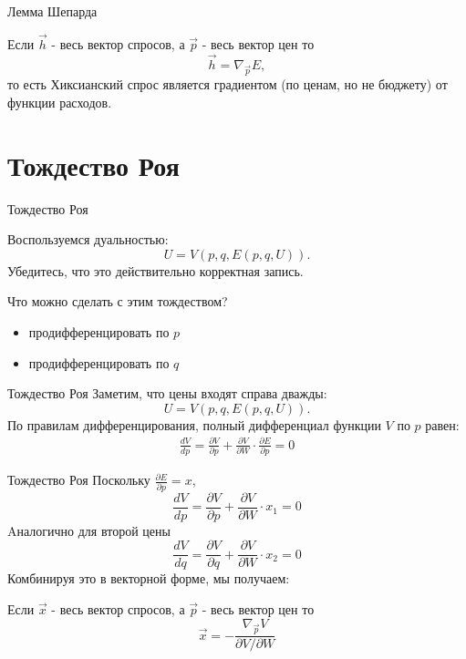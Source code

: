 \documentclass{beamer}
\begin{document}
\begin{frame}{Лемма Шепарда}
\begin{theorem}
Если $\vec{h}$ - весь вектор спросов, а $\vec{p}$ - весь вектор цен то
$$\vec{h} = \nabla_{\vec{p}} E,$$
то есть Хиксианский спрос является градиентом (по ценам, но не бюджету) от функции расходов.
\end{theorem}

\end{frame}

\section{Тождество Роя}

\begin{frame}{Тождество Роя}

Воспользуемся дуальностью:
$$U = V(p, q, E(p,q,U)).$$
Убедитесь, что это действительно корректная запись.

Что можно сделать с этим тождеством?
\begin{itemize}
\item продифференцировать по $p$
\item продифференцировать по $q$
\end{itemize}

\end{frame}


\begin{frame}{Тождество Роя}
Заметим, что цены входят справа дважды:
$$U = V(p, q, E(p,q,U)).$$
По правилам дифференцирования, полный дифференциал функции $V$ по $p$ равен:
\begin{gather*}
\frac{d V}{d p} = \frac{\partial V}{\partial p} + \frac{\partial V}{\partial W} \cdot \frac{\partial E}{\partial p} = 0
\end{gather*}

\end{frame}

\begin{frame}{Тождество Роя}
Поскольку $\frac{\partial E}{\partial p} = x$, 
$$\frac{d V}{d p} = \frac{\partial V}{\partial p} + \frac{\partial V}{\partial W} \cdot x_1 = 0$$
Aналогично для второй цены
$$\frac{d V}{d q} = \frac{\partial V}{\partial q} + \frac{\partial V}{\partial W} \cdot x_2 = 0$$
Комбинируя это в векторной форме, мы получаем:

\begin{theorem}
Если $\vec{x}$ - весь вектор спросов, а $\vec{p}$ - весь вектор цен то
$$\vec{x} = - \frac{\nabla_{\vec{p}} V}{\partial V / \partial W } $$
\end{theorem}

\end{frame}
\end{document}
